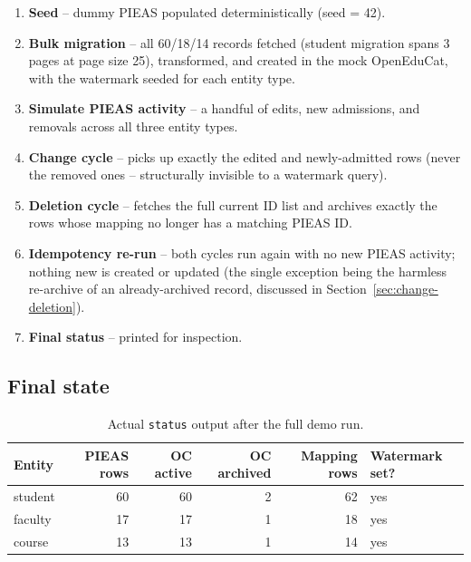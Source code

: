 \documentclass[11pt,a4paper]{article}
\begin{document}
\begin{enumerate}[leftmargin=1.4em]
    \item \textbf{Seed} -- dummy PIEAS populated deterministically (seed = 42).
    \item \textbf{Bulk migration} -- all 60/18/14 records fetched (student migration spans 3
          pages at page size 25), transformed, and created in the mock OpenEduCat, with the
          watermark seeded for each entity type.
    \item \textbf{Simulate PIEAS activity} -- a handful of edits, new admissions, and removals
          across all three entity types.
    \item \textbf{Change cycle} -- picks up exactly the edited and newly-admitted rows (never
          the removed ones -- structurally invisible to a watermark query).
    \item \textbf{Deletion cycle} -- fetches the full current ID list and archives exactly the
          rows whose mapping no longer has a matching PIEAS ID.
    \item \textbf{Idempotency re-run} -- both cycles run again with no new PIEAS activity;
          nothing new is created or updated (the single exception being the harmless re-archive
          of an already-archived record, discussed in Section~\ref{sec:change-deletion}).
    \item \textbf{Final status} -- printed for inspection.
\end{enumerate}

\subsection{Final state}

\begin{table}[H]
\centering
\small
\begin{tabular}{@{}lrrrrl@{}}
\toprule
\textbf{Entity} & \textbf{PIEAS rows} & \textbf{OC active} & \textbf{OC archived} &
\textbf{Mapping rows} & \textbf{Watermark set?} \\
\midrule
student & 60 & 60 & 2 & 62 & yes \\
faculty & 17 & 17 & 1 & 18 & yes \\
course  & 13 & 13 & 1 & 14 & yes \\
\bottomrule
\end{tabular}
\caption{Actual \texttt{status} output after the full demo run.}
\end{table}
\end{document}
